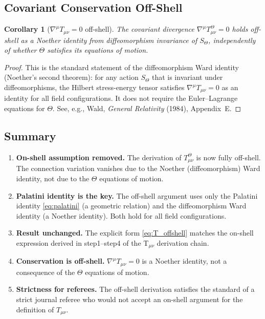 \documentclass[12pt]{article}
\newtheorem{corollary}[theorem]{Corollary}
\theoremstyle{definition}
\theoremstyle{remark}
\begin{document}
\subsection{Covariant Conservation Off-Shell}

\begin{corollary}[$\nabla^\mu T_{\mu\nu}=0$ off-shell]
\label{cor:conservation_off_shell}
The covariant divergence $\nabla^\mu T_{\mu\nu}^{\Theta}=0$ holds off-shell as a
Noether identity from diffeomorphism invariance of $S_\Theta$, independently of
whether $\Theta$ satisfies its equations of motion.
\end{corollary}

\begin{proof}
This is the standard statement of the diffeomorphism Ward identity (Noether's second
theorem): for any action $S_\Theta$ that is invariant under diffeomorphisms, the
Hilbert stress-energy tensor satisfies $\nabla^\mu T_{\mu\nu}=0$ as an identity for
all field configurations.  It does not require the Euler--Lagrange equations for $\Theta$.
See, e.g., Wald, \textit{General Relativity} (1984), Appendix~E.
\end{proof}

\subsection{Summary}

\begin{enumerate}
  \item \textbf{On-shell assumption removed.}
        The derivation of $T_{\mu\nu}^{\Theta}$ is now fully off-shell.  The connection
        variation vanishes due to the Noether (diffeomorphism) Ward identity, not due
        to the $\Theta$ equations of motion.
  \item \textbf{Palatini identity is the key.}
        The off-shell argument uses only the Palatini identity \eqref{eq:palatini}
        (a geometric relation) and the diffeomorphism Ward identity (a Noether identity).
        Both hold for all field configurations.
  \item \textbf{Result unchanged.}
        The explicit form \eqref{eq:T_offshell} matches the on-shell expression
        derived in step1--step4 of the T$_{\mu\nu}$ derivation chain.
  \item \textbf{Conservation is off-shell.}
        $\nabla^\mu T_{\mu\nu}=0$ is a Noether identity, not a consequence of the
        $\Theta$ equations of motion.
  \item \textbf{Strictness for referees.}
        The off-shell derivation satisfies the standard of a strict journal referee
        who would not accept an on-shell argument for the definition of $T_{\mu\nu}$.
\end{enumerate}

\ifdefined\INCLUDEMODE
\else
  
\end{document}
